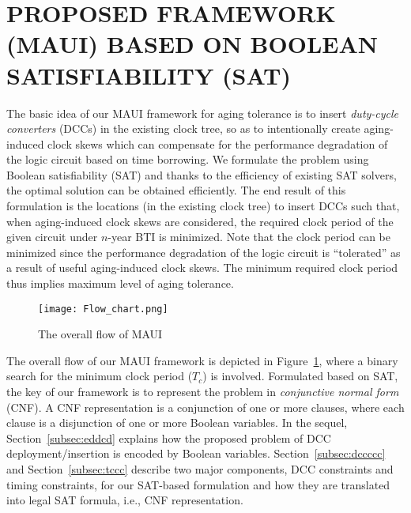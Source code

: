 \section{PROPOSED FRAMEWORK (MAUI) BASED ON BOOLEAN SATISFIABILITY (SAT)}
\label{sec:framework}
The basic idea of our MAUI framework for aging tolerance is to insert \textit{duty-cycle converters} (DCCs) in the existing clock tree, so as to intentionally create aging-induced clock skews which can compensate for the performance degradation of the logic circuit based on time borrowing. We formulate the problem using Boolean satisfiability (SAT) and thanks to the efficiency of existing SAT solvers, the optimal solution can be obtained efficiently. The end result of this formulation is the locations (in the existing clock tree) to insert DCCs such that, when aging-induced clock skews are considered, the required clock period of the given circuit under $n$-year BTI is minimized. Note that the clock period can be minimized since the performance degradation of the logic circuit is \enquote{tolerated} as a result of useful aging-induced clock skews. The minimum required clock period thus implies maximum level of aging tolerance.


\begin{figure}
	\centering
	\texttt{[image: Flow\_chart.png]}
	\caption{The overall flow of MAUI}
	\label{fig:flow}
\end{figure}

The overall flow of our MAUI framework is depicted in Figure~\ref{fig:flow}, where a binary search for the minimum clock period ($T_c$) is involved. Formulated based on SAT, the key of our framework is to represent the problem in \textit{conjunctive normal form} (CNF). A CNF representation is a conjunction of one or more clauses, where each clause is a disjunction of one or more Boolean variables. In the sequel, Section~\ref{subsec:eddcd} explains how the proposed problem of DCC deployment/insertion is encoded by Boolean variables. Section~\ref{subsec:dccccc} and Section~\ref{subsec:tccc} describe two major components, DCC constraints and timing constraints, for our SAT-based formulation and how they are translated into legal SAT formula, i.e., CNF representation.

